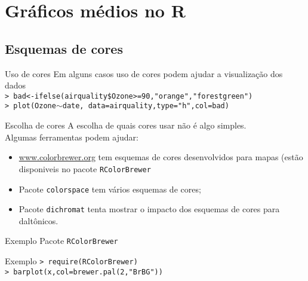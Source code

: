 \documentclass{beamer}
\begin{document}
\section{Gráficos médios no R}
\subsection{Esquemas de cores}
\begin{frame}{Uso de cores}
Em alguns casos uso de cores podem ajudar a visualização dos dados \\
\texttt{> bad<-ifelse(airquality\$Ozone>=90,"orange","forestgreen")\\
> plot(Ozone$\sim$date, data=airquality,type="h",col=bad)}
\begin{center}
   
\end{center}
\end{frame}

\begin{frame}{Escolha de cores}
A escolha de quais cores usar não é algo simples. \\
Algumas ferramentas podem ajudar:
\begin{itemize}
\item \url{www.colorbrewer.org} tem esquemas de cores desenvolvidos para mapas (estão disponiveis no pacote \texttt{RColorBrewer}
\item Pacote \texttt{colorspace} tem vários esquemas de cores;
\item Pacote \texttt{dichromat} tenta mostrar o impacto dos esquemas de cores para daltônicos.
\end{itemize}
\end{frame}

\begin{frame}{Exemplo}
Pacote \texttt{RColorBrewer}\\
\centering
{}
\end{frame}
\begin{frame}{Exemplo}
\texttt{> require(RColorBrewer)\\
> barplot(x,col=brewer.pal(2,"BrBG"))}

\begin{center}
\end{center}
\end{frame}
\end{document}

